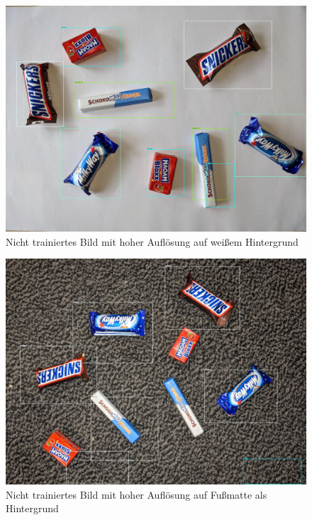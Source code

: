     \begin{figure}[H]
        \centering
        \includegraphics[angle = 90, width = \textwidth]{Bilder/models/model_comparison/ssd_resnet101_v1_fpn_640x640_coco17_tpu-8/HD_on_white.jpg}
        \caption{Nicht trainiertes Bild mit hoher Auflösung auf weißem Hintergrund}
    \end{figure}
    
    \begin{figure}[H]
        \centering
        \includegraphics[angle = 90, width = \textwidth]{Bilder/models/model_comparison/ssd_resnet101_v1_fpn_640x640_coco17_tpu-8/HD_on_doormat.jpg}
        \caption{Nicht trainiertes Bild mit hoher Auflösung auf Fußmatte als Hintergrund}
    \end{figure}
    
